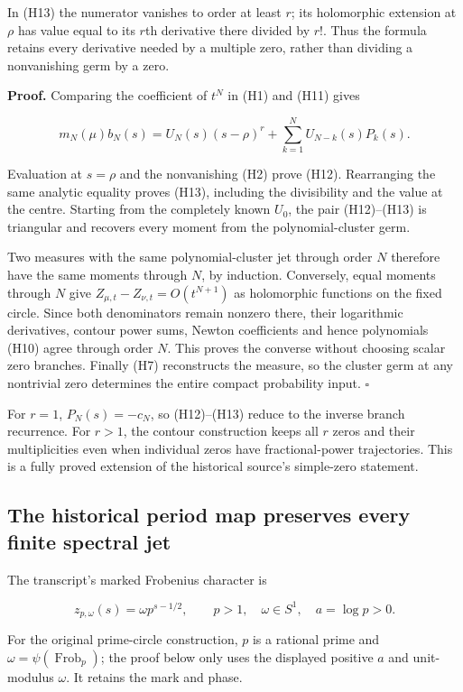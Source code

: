 In (H13) the numerator vanishes to order at least \(r\); its holomorphic extension at \(\rho\) has value equal to its \(r\)th derivative there divided by \(r!\). Thus the formula retains every derivative needed by a multiple zero, rather than dividing a nonvanishing germ by a zero.

\textbf{Proof.} Comparing the coefficient of \(t^N\) in (H1) and (H11) gives

\[
m_N(\mu)b_N(s)
=U_N(s)(s-\rho)^r+\sum_{k=1}^{N}U_{N-k}(s)P_k(s).
\]

Evaluation at \(s=\rho\) and the nonvanishing (H2) prove (H12). Rearranging the same analytic equality proves (H13), including the divisibility and the value at the centre. Starting from the completely known \(U_0\), the pair (H12)--(H13) is triangular and recovers every moment from the polynomial-cluster germ.

Two measures with the same polynomial-cluster jet through order \(N\) therefore have the same moments through \(N\), by induction. Conversely, equal moments through \(N\) give \(Z_{\mu ,t}-Z_{\nu ,t}=O(t^{N+1})\) as holomorphic functions on the fixed circle. Since both denominators remain nonzero there, their logarithmic derivatives, contour power sums, Newton coefficients and hence polynomials (H10) agree through order \(N\). This proves the converse without choosing scalar zero branches. Finally (H7) reconstructs the measure, so the cluster germ at any nontrivial zero determines the entire compact probability input. \(\square\)

For \(r=1\), \(P_N(s)=-c_N\), so (H12)--(H13) reduce to the inverse branch recurrence. For \(r>1\), the contour construction keeps all \(r\) zeros and their multiplicities even when individual zeros have fractional-power trajectories. This is a fully proved extension of the historical source's simple-zero statement.

\subsection{The historical period map preserves every finite spectral jet}\label{the-historical-period-map-preserves-every-finite-spectral-jet}

The transcript's marked Frobenius character is

\[
z_{p,\omega}(s)=\omega p^{s-1/2},\qquad
p>1,\quad\omega\in S^1,\quad a=\log p>0.
\tag{J1}
\]

For the original prime-circle construction, \(p\) is a rational prime and \(\omega=\psi(\operatorname{Frob}_p)\); the proof below only uses the displayed positive \(a\) and unit-modulus \(\omega\). It retains the mark and phase.

